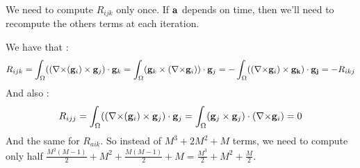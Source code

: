 \begin{rk}
  We need to compute $R_{ijk}$ only once. If ${\mathbf{a}}$ depends on time, then we'll need to recompute the others terms at each iteration.
\end{rk}
\begin{rk}
  We have that :
  \[ R_{ijk}=\int_\Omega(({\nabla\times}({\mathbf{g}}_i)\times{\mathbf{g}}_j)\cdot{\mathbf{g}}_k=\int_\Omega({\mathbf{g}}_k\times({\nabla\times}{\mathbf{g}}_i))\cdot{\mathbf{g}}_j=-\int_\Omega(({\nabla\times}{\mathbf{g}}_i)\times{\mathbf{g_k}})\cdot{\mathbf{g_j}}=-R_{ikj}\]
  And also :
  \[ R_{ijj}=\int_\Omega(({\nabla\times}({\mathbf{g}}_i)\times{\mathbf{g}}_j)\cdot{\mathbf{g}}_j=\int_\Omega({\mathbf{g}}_j\times{\mathbf{g}}_j)\cdot({\nabla\times}{\mathbf{g}}_i)=0 \]
  And the same for $R_{aik}$. So instead of $M^3+2M^2+M$ terms, we need to compute only half $\frac{M^2(M-1)}{2}+M^2+\frac{M(M-1)}{2}+M=\frac{M^3}{2}+M^2+\frac{M}{2}$.
\end{rk}

